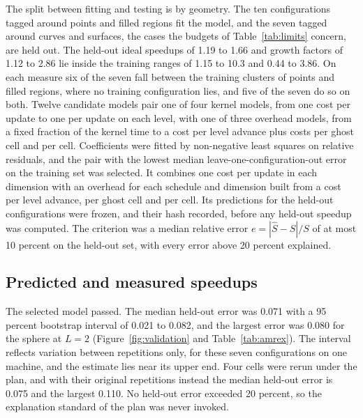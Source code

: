 \documentclass[12pt]{article}
\theoremstyle{remark}
\begin{document}
The split between fitting and testing is by geometry. The ten configurations tagged around points and filled regions fit the model, and the seven tagged around curves and surfaces, the cases the budgets of Table~\ref{tab:limits} concern, are held out. The held-out ideal speedups of 1.19 to 1.66 and growth factors of 1.12 to 2.86 lie inside the training ranges of 1.15 to 10.3 and 0.44 to 3.86. On each measure six of the seven fall between the training clusters of points and filled regions, where no training configuration lies, and five of the seven do so on both. Twelve candidate models pair one of four kernel models, from one cost per update to one per update on each level, with one of three overhead models, from a fixed fraction of the kernel time to a cost per level advance plus costs per ghost cell and per cell. Coefficients were fitted by non-negative least squares on relative residuals, and the pair with the lowest median leave-one-configuration-out error on the training set was selected. It combines one cost per update in each dimension with an overhead for each schedule and dimension built from a cost per level advance, per ghost cell and per cell. Its predictions for the held-out configurations were frozen, and their hash recorded, before any held-out speedup was computed. The criterion was a median relative error $e=|\hat S-S|/S$ of at most 10 percent on the held-out set, with every error above 20 percent explained.

\subsection{Predicted and measured speedups}\label{sec:prediction}

The selected model passed. The median held-out error was 0.071 with a 95 percent bootstrap interval of 0.021 to 0.082, and the largest error was 0.080 for the sphere at $L=2$ (Figure~\ref{fig:validation} and Table~\ref{tab:amrex}). The interval reflects variation between repetitions only, for these seven configurations on one machine, and the estimate lies near its upper end. Four cells were rerun under the plan, and with their original repetitions instead the median held-out error is 0.075 and the largest 0.110. No held-out error exceeded 20 percent, so the explanation standard of the plan was never invoked.
\end{document}

